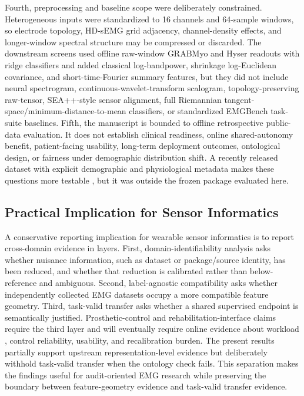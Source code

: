 \documentclass[journal]{IEEEtran}
\begin{document}
Fourth, preprocessing and baseline scope were deliberately constrained. Heterogeneous inputs were standardized to 16 channels and 64-sample windows, so electrode topology, HD-sEMG grid adjacency, channel-density effects, and longer-window spectral structure may be compressed or discarded. The downstream screens used offline raw-window GRABMyo and Hyser readouts with ridge classifiers and added classical log-bandpower, shrinkage log-Euclidean covariance, and short-time-Fourier summary features, but they did not include neural spectrogram, continuous-wavelet-transform scalogram, topology-preserving raw-tensor, SEA++-style sensor alignment, full Riemannian tangent-space/minimum-distance-to-mean classifiers, or standardized EMGBench task-suite baselines. Fifth, the manuscript is bounded to offline retrospective public-data evaluation. It does not establish clinical readiness, online shared-autonomy benefit, patient-facing usability, long-term deployment outcomes, ontological design, or fairness under demographic distribution shift. A recently released dataset with explicit demographic and physiological metadata makes these questions more testable \cite{gowda2025demographicsemg}, but it was outside the frozen package evaluated here.

\subsection{Practical Implication for Sensor Informatics}
A conservative reporting implication for wearable sensor informatics is to report cross-domain evidence in layers. First, domain-identifiability analysis asks whether nuisance information, such as dataset or package/source identity, has been reduced, and whether that reduction is calibrated rather than below-reference and ambiguous. Second, label-agnostic compatibility asks whether independently collected EMG datasets occupy a more compatible feature geometry. Third, task-valid transfer asks whether a shared supervised endpoint is semantically justified. Prosthetic-control and rehabilitation-interface claims require the third layer and will eventually require online evidence about workload \cite{park2024workload}, control reliability, usability, and recalibration burden. The present results partially support upstream representation-level evidence but deliberately withhold task-valid transfer when the ontology check fails. This separation makes the findings useful for audit-oriented EMG research while preserving the boundary between feature-geometry evidence and task-valid transfer evidence.
\end{document}
